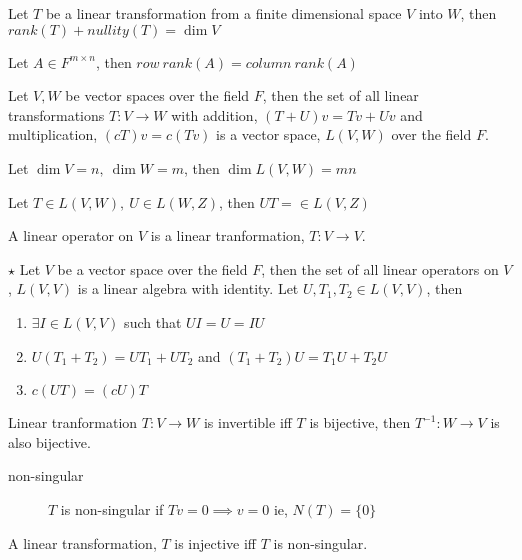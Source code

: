 	\begin{theorem}
		Let $T$ be a linear transformation from a finite dimensional space $V$ into $W$, then $rank(T) + nullity(T) = \dim V$
	\end{theorem}
	\begin{theorem}
		Let $A \in F^{m \times n}$, then $row\ rank(A) = column\ rank(A)$
	\end{theorem}
	\begin{theorem}
		Let $V,W$ be vector spaces over the field $F$, then the set of all linear transformations $T : V \to W$ with addition, $(T+U)v = Tv + Uv$ and multiplication, $(cT)v = c(Tv)$ is a vector space, $L(V,W)$ over the field $F$.
	\end{theorem}
	\begin{theorem}
		Let $\dim V = n,\ \dim W = m$, then $\dim L(V,W) = mn$
	\end{theorem}
	\begin{theorem}
		Let $T \in L(V,W),\ U \in L(W,Z)$, then $UT = \in L(V,Z)$
	\end{theorem}
	\begin{remark}
		A linear operator on $V$ is a linear tranformation, $T : V \to V$.
	\end{remark}
	\begin{lemma}$\star$
		Let $V$ be a vector space over the field $F$, then the set of all linear operators on $V$, $L(V,V)$ is a linear algebra with identity. Let $U, T_1, T_2 \in L(V,V)$, then
		\begin{enumerate}
			\item $\exists I \in L(V,V)$ such that $UI = U = IU$
			\item $U(T_1 + T_2) = UT_1 + UT_2$ and $(T_1+T_2)U = T_1U + T_2U$
			\item $c(UT) = (cU)T$
		\end{enumerate}
	\end{lemma}
	\begin{theorem}
		Linear tranformation $T : V \to W$ is invertible iff $T$ is bijective, then $T^{-1} : W \to V$ is also bijective.
	\end{theorem}
	\begin{description}
		\item[non-singular] $T$ is non-singular if $Tv = 0 \implies v = 0$ ie, $N(T) = \{ 0 \}$
	\end{description}
	\begin{theorem}
		A linear transformation, $T$ is injective iff $T$ is non-singular.
	\end{theorem}

